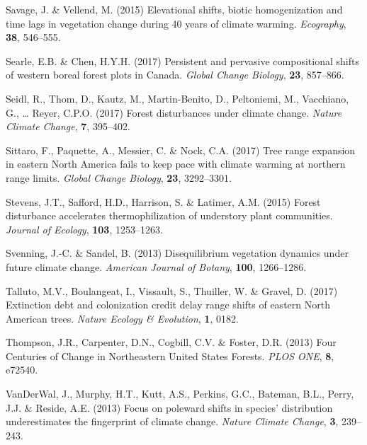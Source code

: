 \documentclass[a4paperpaper,]{article}
\begin{document}
\leavevmode\hypertarget{ref-savage_elevational_2015}{}%
Savage, J. \& Vellend, M. (2015) Elevational shifts, biotic
homogenization and time lags in vegetation change during 40 years of
climate warming. \emph{Ecography}, \textbf{38}, 546--555.

\leavevmode\hypertarget{ref-searle_persistent_2017}{}%
Searle, E.B. \& Chen, H.Y.H. (2017) Persistent and pervasive
compositional shifts of western boreal forest plots in Canada.
\emph{Global Change Biology}, \textbf{23}, 857--866.

\leavevmode\hypertarget{ref-seidl_forest_2017}{}%
Seidl, R., Thom, D., Kautz, M., Martin-Benito, D., Peltoniemi, M.,
Vacchiano, G., \ldots{} Reyer, C.P.O. (2017) Forest disturbances under
climate change. \emph{Nature Climate Change}, \textbf{7}, 395--402.

\leavevmode\hypertarget{ref-sittaro_tree_2017}{}%
Sittaro, F., Paquette, A., Messier, C. \& Nock, C.A. (2017) Tree range
expansion in eastern North America fails to keep pace with climate
warming at northern range limits. \emph{Global Change Biology},
\textbf{23}, 3292--3301.

\leavevmode\hypertarget{ref-stevens_forest_2015}{}%
Stevens, J.T., Safford, H.D., Harrison, S. \& Latimer, A.M. (2015)
Forest disturbance accelerates thermophilization of understory plant
communities. \emph{Journal of Ecology}, \textbf{103}, 1253--1263.

\leavevmode\hypertarget{ref-svenning_disequilibrium_2013}{}%
Svenning, J.-C. \& Sandel, B. (2013) Disequilibrium vegetation dynamics
under future climate change. \emph{American Journal of Botany},
\textbf{100}, 1266--1286.

\leavevmode\hypertarget{ref-talluto_extinction_2017}{}%
Talluto, M.V., Boulangeat, I., Vissault, S., Thuiller, W. \& Gravel, D.
(2017) Extinction debt and colonization credit delay range shifts of
eastern North American trees. \emph{Nature Ecology \& Evolution},
\textbf{1}, 0182.

\leavevmode\hypertarget{ref-thompson_four_2013}{}%
Thompson, J.R., Carpenter, D.N., Cogbill, C.V. \& Foster, D.R. (2013)
Four Centuries of Change in Northeastern United States Forests.
\emph{PLOS ONE}, \textbf{8}, e72540.

\leavevmode\hypertarget{ref-vanderwal_focus_2013}{}%
VanDerWal, J., Murphy, H.T., Kutt, A.S., Perkins, G.C., Bateman, B.L.,
Perry, J.J. \& Reside, A.E. (2013) Focus on poleward shifts in species'
distribution underestimates the fingerprint of climate change.
\emph{Nature Climate Change}, \textbf{3}, 239--243.
\end{document}
